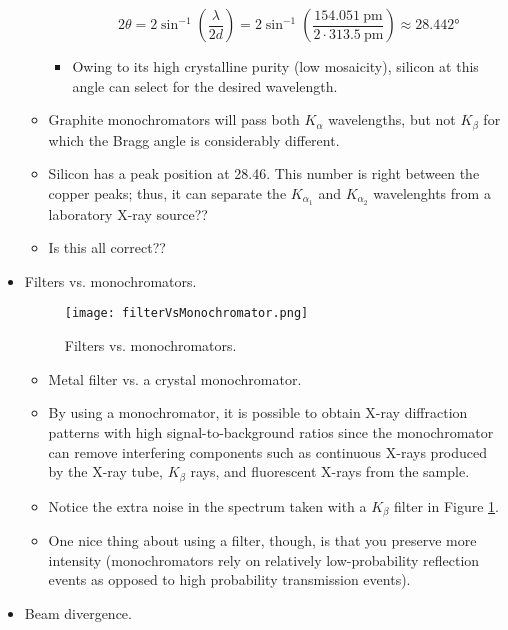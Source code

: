 \documentclass[../notes.tex]{subfiles}
\begin{document}
\begin{itemize}
\begin{itemize}
\begin{itemize}
\begin{equation*}
                2\theta = 2\sin^{-1}\left( \frac{\lambda}{2d} \right)
                = 2\sin^{-1}\left( \frac{\SI{154.051}{\pico\meter}}{2\cdot\SI{313.5}{\pico\meter}} \right)
                \approx \ang{28.442}
            \end{equation*}
            \item Owing to its high crystalline purity (low mosaicity), silicon at this angle can select for the desired wavelength.
        \end{itemize}
        \item Graphite monochromators will pass both $K_\alpha$ wavelengths, but not $K_\beta$ for which the Bragg angle is considerably different.
        \item Silicon has a peak position at 28.46. This number is right between the copper peaks; thus, it can separate the $K_{\alpha_1}$ and $K_{\alpha_2}$ wavelenghts from a laboratory X-ray source??
        \item Is this all correct??
    \end{itemize}
    \item Filters vs. monochromators.
    \begin{figure}[h!]
        \centering
        \texttt{[image: filterVsMonochromator.png]}
        \caption{Filters vs. monochromators.}
        \label{fig:filterVsMonochromator}
    \end{figure}
    \begin{itemize}
        \item Metal filter vs. a crystal monochromator.
        \item By using a monochromator, it is possible to obtain X-ray diffraction patterns with high signal-to-background ratios since the monochromator can remove interfering components such as continuous X-rays produced by the X-ray tube, $K_\beta$ rays, and fluorescent X-rays from the sample.
        \item Notice the extra noise in the spectrum taken with a $K_\beta$ filter in Figure \ref{fig:filterVsMonochromator}.
        \item One nice thing about using a filter, though, is that you preserve more intensity (monochromators rely on relatively low-probability reflection events as opposed to high probability transmission events).
    \end{itemize}
    \item Beam divergence.
    \begin{figure}[H]
        \centering
        \begin{subfigure}[b]{0.3\linewidth}

\end{subfigure}
\end{figure}
\end{itemize}
\end{document}

